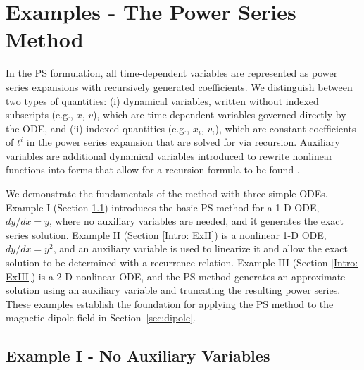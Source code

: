 \documentclass{article}
\begin{document}
\section{Examples - The Power Series Method}
\label{sect:examples}
In the PS formulation, all time-dependent variables are represented as power series expansions with recursively generated coefficients. We distinguish between two types of quantities: (i) dynamical variables, written without indexed subscripts (e.g., $x$, $v$), which are time-dependent variables governed directly by the ODE, and (ii) indexed quantities (e.g., $x_i$, $v_i$), which are constant coefficients of $t^i$ in the power series expansion that are solved for via recursion. Auxiliary variables are additional dynamical variables introduced to rewrite nonlinear functions into forms that allow for a recursion formula to be found \cite{Parker1996, Rudmin1998}.

We demonstrate the fundamentals of the method with three simple ODEs. Example I (Section \ref{Intro: ExI}) introduces the basic PS method for a 1-D ODE, $dy/dx=y$, where no auxiliary variables are needed, and it generates the exact series solution. Example II (Section \ref{Intro: ExII}) is a nonlinear 1-D ODE, $dy/dx=y^2$, and an auxiliary variable is used to linearize it and allow the exact solution to be determined with a recurrence relation. Example III (Section \ref{Intro: ExIII}) is a 2-D nonlinear ODE, and the PS method generates an approximate solution using an auxiliary variable and truncating the resulting power series. These examples establish the foundation for applying the PS method to the magnetic dipole field in Section~\ref{sec:dipole}.

\subsection{Example I - No Auxiliary Variables}\label{Intro: ExI}
\end{document}
